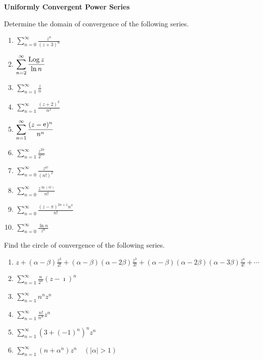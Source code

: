 {%
\begin{large}
  \noindent
  \textbf{Uniformly Convergent Power Series}
\end{large}


\begin{Exercise}
  \label{exercise convergence zn / (z+3)n}
  Determine the domain of convergence of the following series.
  \begin{enumerate}
  \item
    $\displaystyle \sum_{n=0}^\infty \frac{z^n}{(z + 3)^n}$
  \item
    $\displaystyle \sum_{n=2}^\infty \frac{\mathop{\mathrm{Log}}\nolimits z}{\ln n}$
  \item
    $\displaystyle \sum_{n=1}^\infty \frac{z}{n}$
  \item
    $\displaystyle \sum_{n=1}^\infty \frac{(z + 2)^2}{n^2}$
  \item
    $\displaystyle \sum_{n=1}^\infty \frac{(z - \mathop{\mathrm{e}}\nolimits)^n}{n^n}$
  \item
    $\displaystyle \sum_{n=1}^\infty \frac{z^{2n}}{2^{n z}}$
  \item
    $\displaystyle \sum_{n=0}^\infty \frac{z^{n!}}{(n!)^2}$
  \item
    $\displaystyle \sum_{n=0}^\infty \frac{z^{\ln(n!)}}{n!}$
  \item
    $\displaystyle \sum_{n=0}^\infty \frac{ (z - \pi)^{2 n + 1} n^\pi }{ n! }$
  \item
    $\displaystyle \sum_{n=0}^\infty \frac{ \ln n }{ z^n }$
  \end{enumerate}

\end{Exercise}




\begin{Exercise}
  \label{exercise convergence n/2^n (z-i)^n}
  Find the circle of convergence of the following series.
  \begin{enumerate}
  \item $\displaystyle z + (\alpha - \beta) \frac{z^2}{2!}
    + (\alpha - \beta) (\alpha - 2 \beta) \frac{z^3}{3!}
    + (\alpha - \beta) (\alpha - 2 \beta)(\alpha - 3 \beta) \frac{z^4}{4!} + \cdots$
  \item $\displaystyle \sum_{n = 1}^\infty \frac{n}{2^n} (z - \imath)^n$
  \item $\displaystyle \sum_{n = 1}^\infty n^n z^n$
  \item $\displaystyle \sum_{n = 1}^\infty \frac{n!}{n^n} z^n$
  \item $\displaystyle \sum_{n = 1}^\infty \left( 3 + (-1)^n \right)^n z^n$
  \item $\displaystyle \sum_{n = 1}^\infty \left( n + \alpha^n \right) z^n \quad (|\alpha| > 1)$
  \end{enumerate}


\end{Exercise}}
